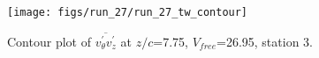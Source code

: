 \begin{figure}[H]
\centering
\texttt{[image: figs/run\_27/run\_27\_tw\_contour]}
\caption{Contour plot of $\overline{v_{\theta}^{\prime} v_{z}^{\prime}}$ at $z/c$=7.75, $V_{free}$=26.95, station 3.}
\label{fig:run_27_tw_contour}
\end{figure}


